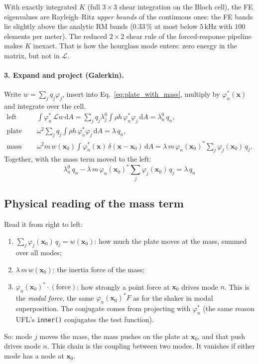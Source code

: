 With exactly integrated $K$ (full $3\times 3$ shear integration on the Bloch
cell), the FE eigenvalues are Rayleigh--Ritz \emph{upper bounds} of the
continuous ones: the FE bands lie slightly above the analytic RM bands
($0.33\,\%$ at most below $5\,\mathrm{kHz}$ with $100$ elements per meter). The
reduced $2\times 2$ shear rule of the forced-response pipeline makes $K$ inexact.
That is how the hourglass mode enters: zero energy in the matrix, but not in
$\mathcal{L}$.

\paragraph{3. Expand and project (Galerkin).}
Write $w = \sum_j q_j \varphi_j$, insert into Eq.~\eqref{eq:plate_with_mass},
multiply by $\varphi_n^*(\mathbf{x})$ and integrate over the cell.
\begin{align}
  \text{left side:} \quad
  & \int \varphi_n^*\, \mathcal{L} w \,\mathrm{d}A
    = \sum_j q_j \lambda_j^0 \int \rho h\, \varphi_n^* \varphi_j \,\mathrm{d}A
    = \lambda_n^0\, q_n , \\
  \text{plate term:} \quad
  & \omega^2 \sum_j q_j \int \rho h\, \varphi_n^* \varphi_j \,\mathrm{d}A
    = \lambda\, q_n , \\
  \text{mass term:} \quad
  & \omega^2 m\, w(\mathbf{x}_0) \int \varphi_n^*(\mathbf{x})\, \delta(\mathbf{x} - \mathbf{x}_0)\,\mathrm{d}A
    = \lambda\, m\, \varphi_n(\mathbf{x}_0)^* \sum_j \varphi_j(\mathbf{x}_0)\, q_j .
\end{align}
Together, with the mass term moved to the left:
\begin{equation}
  \boxed{\;\lambda_n^0\, q_n - \lambda\, m\, \varphi_n(\mathbf{x}_0)^* \sum_j \varphi_j(\mathbf{x}_0)\, q_j = \lambda\, q_n\;}
  \label{eq:modal_equation}
\end{equation}

\subsection{Physical reading of the mass term}
Read it from right to left:
\begin{enumerate}
  \item $\sum_j \varphi_j(\mathbf{x}_0)\, q_j = w(\mathbf{x}_0)$: how much
        the plate moves at the mass, summed over all modes;
  \item $\lambda\, m\, w(\mathbf{x}_0)$: the inertia force of the mass;
  \item $\varphi_n(\mathbf{x}_0)^* \cdot (\text{force})$: how strongly a
        point force at $\mathbf{x}_0$ drives mode $n$. This is the
        \emph{modal force}, the same $\varphi_n(\mathbf{x}_0)^* F$ as for the
        shaker in modal superposition. The conjugate comes from projecting
        with $\varphi_n^*$ (the same reason UFL's \texttt{inner()} conjugates
        the test function).
\end{enumerate}
So: mode $j$ moves the mass, the mass pushes on the plate at $\mathbf{x}_0$,
and that push drives mode $n$. This chain is the coupling between two modes.
It vanishes if either mode has a node at $\mathbf{x}_0$.

